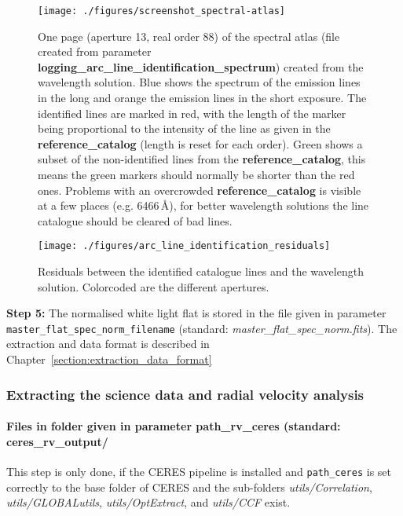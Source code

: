 \documentclass[10pt,a4paper]{article}
\begin{document}
\begin{figure} 
  \begin{center}
    \texttt{[image: ./figures/screenshot\_spectral-atlas]}
  \end{center} 
  \caption{One page (aperture 13, real order 88) of the spectral atlas (file created from parameter \textbf{logging\_arc\_line\_identification\_spectrum}) created from the wavelength solution. Blue shows the spectrum of the emission lines in the long and orange the emission lines in the short exposure. The identified lines are marked in red, with the length of the marker being proportional to the intensity of the line as given in the \textbf{reference\_catalog} (length is reset for each order). Green shows a subset of the non-identified lines from the \textbf{reference\_catalog}, this means the green markers should normally be shorter than the red ones. Problems with an overcrowded \textbf{reference\_catalog} is visible at a few places (e.g. 6466\,\AA), for better wavelength solutions the line catalogue should be cleared of bad lines.
    \label{figure_arc_line_identification_spectrum}}
\end{figure}


\begin{figure} 
  \begin{center}
    \texttt{[image: ./figures/arc\_line\_identification\_residuals]}
  \end{center} 
  \caption{Residuals between the identified catalogue lines and the wavelength solution. Colorcoded are the different apertures.
    \label{figure_arc_line_identification_residuals}}
\end{figure}

\vspace{0.5em}\noindent \textbf{Step 5:} The normalised white light flat is stored in the file given in parameter \verb|master_flat_spec_norm_filename| (standard: \textit{master\_flat\_spec\_norm.fits}). The extraction and data format is described in Chapter~\ref{section:extraction_data_format}

\subsubsection{Extracting the science data and radial velocity analysis}
\paragraph{Files in folder given in parameter path\_rv\_ceres (standard: ceres\_rv\_output/}
This step is only done, if the CERES pipeline is installed and \verb|path_ceres| is set correctly to the base folder of CERES and the sub-folders \textit{utils/Correlation}, \textit{utils/GLOBALutils}, \textit{utils/OptExtract}, and \textit{utils/CCF} exist.
\end{document}

